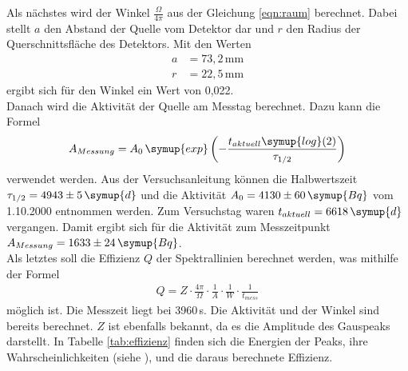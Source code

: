     Als nächstes wird der Winkel $\frac{\Omega}{4\pi}$ aus der Gleichung
    \eqref{eqn:raum}
    berechnet.
    Dabei stellt $a$ den Abstand der Quelle vom Detektor dar und $r$
    den Radius der Querschnittsfläche des Detektors.
    Mit den Werten
    \begin{align*}
      a &= 73,2\,\text{mm}\\
      r &= 22,5\,\text{mm}
    \end{align*}
    ergibt sich für den Winkel ein Wert von 0,022.\\
    Danach wird die Aktivität der Quelle am Messtag berechnet.
    Dazu kann die Formel
    \begin{align*}
      A_{Messung}= A_0\,\symup{exp}\left(-\frac{t_{aktuell}\symup{log}(2)}{\tau_{1/2}}\right)
    \end{align*}
    verwendet werden.
    Aus der Versuchsanleitung können die Halbwertszeit $\tau_{1/2}=4943\pm 5\,\symup{d}$
    und die Aktivität $A_0=4130\pm 60\,\symup{Bq}$ vom 1.10.2000 entnommen werden.
    Zum Versuchstag waren $t_{aktuell}=6618\,\symup{d}$ vergangen.
    Damit ergibt sich für die Aktivität zum Messzeitpunkt
    $A_{Messung}=1633\pm 24\,\symup{Bq}$.\\
    Als letztes soll die Effizienz $Q$ der Spektrallinien berechnet werden,
    was mithilfe der Formel
    \begin{align*}
      Q = Z\cdot \frac{4\pi}\Omega \cdot \frac1A\cdot\frac1W\cdot\frac1{t_{mess}}
    \end{align*}
    möglich ist.
    Die Messzeit liegt bei 3960\,s.
    Die Aktivität und der Winkel sind bereits berechnet.
    $Z$ ist ebenfalls bekannt, da es die Amplitude
    des Gauspeaks darstellt.
    In Tabelle \ref{tab:effizienz} finden sich die Energien der Peaks, ihre Wahrscheinlichkeiten
    (siehe \cite{anleitungv18}),
    und die daraus berechnete Effizienz.

